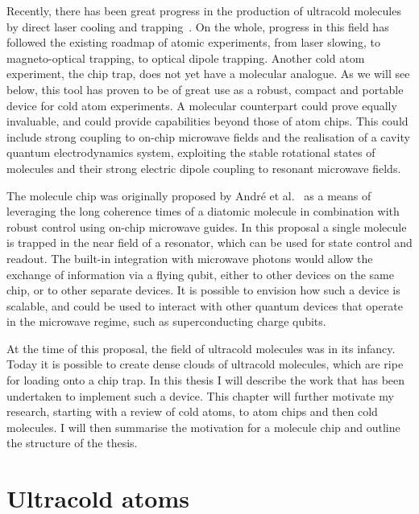 
Recently, there has been great progress in the production of ultracold
molecules by direct laser cooling and trapping~\cite{Fitch2021}. On the whole,
progress in this field has followed the existing roadmap of atomic experiments,
from laser slowing, to magneto-optical trapping, to optical dipole trapping.
Another cold atom experiment, the chip trap, does not yet have a molecular
analogue. As we will see below, this tool has proven to be of great use as a
robust, compact and portable device for cold atom experiments. A molecular
counterpart could prove equally invaluable, and could provide capabilities
beyond those of atom chips.  This could include strong coupling to on-chip
microwave fields and  the realisation of a cavity quantum electrodynamics
system, exploiting the stable rotational states of molecules and their strong
electric dipole coupling to resonant microwave fields.

The molecule chip was originally proposed by Andr\'e et al.~\cite{Andre2006} as
a means of leveraging the long coherence times of a diatomic molecule in
combination with robust control using on-chip microwave guides. In this
proposal a single molecule is trapped in the near field of a resonator, which
can be used for state control and readout. The built-in integration with
microwave photons would allow the exchange of information via a flying qubit,
either to other devices on the same chip, or to other separate devices.
%
It is possible to envision how such a device is scalable, and could be used to 
interact with other quantum devices that operate in the microwave regime, such
as superconducting charge qubits.

At the time of this proposal, the field of ultracold molecules was in its
infancy. Today it is possible to create dense clouds of ultracold molecules,
which are ripe for loading onto a chip trap. In this thesis I will describe the
work that has been undertaken to implement such a device. This chapter will
further motivate my research, starting with a review of cold atoms, to atom
chips and then cold molecules. I will then summarise the motivation for a
molecule chip and outline the structure of the thesis.

\section{Ultracold atoms}
\label{intro:atoms}

